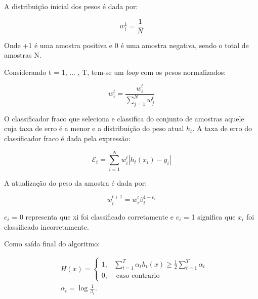 A distribuição inicial dos pesos é dada por:

\begin{equation}
    w_{i}^{1}=\frac{1}{N}
\end{equation}

Onde +1 é uma amostra positiva e 0 é uma amostra negativa, sendo o total de amostras N.

Considerando t = 1, ... , T, tem-se um \textit{loop} com os pesos normalizados:

\begin{equation}
    w_{i}^{t}=\frac{w_{i}^{t}}{\sum_{j=1}^{N} w_{j}^{t}}
\end{equation}

O classificador fraco que seleciona e classifica do conjunto de amostras aquele cuja taxa de erro é a menor e a distribuição do peso atual $h_{t}$. A taxa de erro do classificador fraco é dada pela expressão:

\begin{equation}
    \mathcal{E}_{t}=\sum_{i=1}^{N} w_{i}^{t}\left|h_{t}\left(x_{i}\right)-y_{i}\right|
\end{equation}

A atualização do peso da amostra é dada por:

\begin{equation}
    w_{i}^{t+1}=w_{i}^{t} \beta_{t}^{1-e_{i}}
\end{equation}

$e_{i}$ = 0 representa que xi foi classificado corretamente e $e_{i}$ = 1 significa que $x_{i}$ foi classificado incorretamente.

Como saída final do algoritmo:

\begin{equation}
    \begin{aligned}
    &H(x)= \begin{cases}1, & \sum_{t=1}^{T} \alpha_{t} h_{t}(x) \geq \frac{1}{2} \sum_{t=1}^{T} \alpha_{t} \\ 0, & \text { caso contrario }\end{cases}\\
    &\alpha_{t}=\log \frac{1}{\beta_{t}} .
    \end{aligned}
\end{equation}

